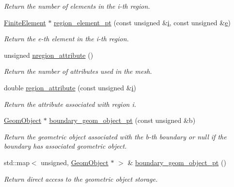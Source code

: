 \begin{DoxyCompactItemize}
\begin{DoxyCompactList}\small\item\em Return the number of elements in the i-\/th region. \end{DoxyCompactList}\item 
\hyperlink{classoomph_1_1FiniteElement}{Finite\+Element} $\ast$ \hyperlink{classoomph_1_1UnstructuredTwoDMeshGeometryBase_abfc8c7de4f4b0050c818a0186e087531}{region\+\_\+element\+\_\+pt} (const unsigned \&\hyperlink{cfortran_8h_adb50e893b86b3e55e751a42eab3cba82}{i}, const unsigned \&\hyperlink{cfortran_8h_a37cd013acc76697829c324bdd8562d82}{e})
\begin{DoxyCompactList}\small\item\em Return the e-\/th element in the i-\/th region. \end{DoxyCompactList}\item 
unsigned \hyperlink{classoomph_1_1UnstructuredTwoDMeshGeometryBase_ab9ae7866b6cdc9f28253edbe4d634fe2}{nregion\+\_\+attribute} ()
\begin{DoxyCompactList}\small\item\em Return the number of attributes used in the mesh. \end{DoxyCompactList}\item 
double \hyperlink{classoomph_1_1UnstructuredTwoDMeshGeometryBase_a166bb8462a9ccb50ce7d93b037bb6597}{region\+\_\+attribute} (const unsigned \&\hyperlink{cfortran_8h_adb50e893b86b3e55e751a42eab3cba82}{i})
\begin{DoxyCompactList}\small\item\em Return the attribute associated with region i. \end{DoxyCompactList}\item 
\hyperlink{classoomph_1_1GeomObject}{Geom\+Object} $\ast$ \hyperlink{classoomph_1_1UnstructuredTwoDMeshGeometryBase_ac22d7ec6fc75341039ad5d6241e55541}{boundary\+\_\+geom\+\_\+object\+\_\+pt} (const unsigned \&b)
\begin{DoxyCompactList}\small\item\em Return the geometric object associated with the b-\/th boundary or null if the boundary has associated geometric object. \end{DoxyCompactList}\item 
std\+::map$<$ unsigned, \hyperlink{classoomph_1_1GeomObject}{Geom\+Object} $\ast$ $>$ \& \hyperlink{classoomph_1_1UnstructuredTwoDMeshGeometryBase_ab6e96f2bdf4d7cd76c6ed3b3459bf065}{boundary\+\_\+geom\+\_\+object\+\_\+pt} ()
\begin{DoxyCompactList}\small\item\em Return direct access to the geometric object storage. \end{DoxyCompactList}\item 

\end{DoxyCompactItemize}
